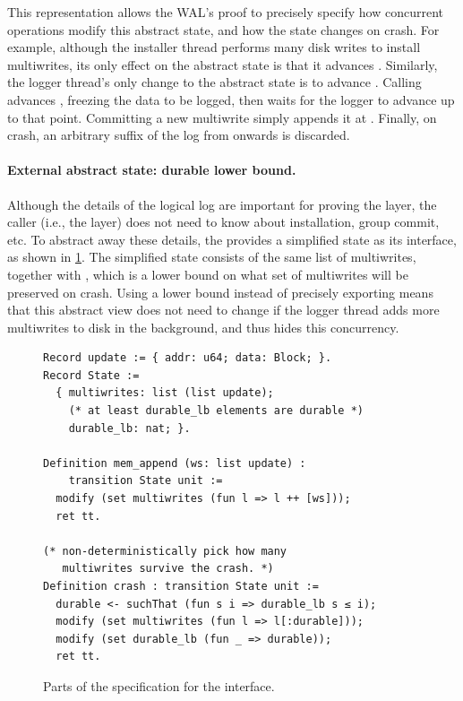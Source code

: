 This representation allows the WAL's proof to precisely specify how concurrent
operations modify this abstract state, and how the state changes on crash.
For example, although the installer thread performs many disk writes to
install multiwrites, its only effect on the abstract state is that it
advances .  Similarly, the logger thread's only change to
the abstract state is to advance .  Calling 
advances , freezing the data to be logged, then waits
for the logger to advance  up to that point.  Committing a
new multiwrite simply appends it at .  Finally, on crash,
an arbitrary suffix of the log from  onwards is discarded.


\paragraph{External abstract state: durable lower bound.}
Although the details of the logical log are important for proving the
 layer, the caller (i.e., the  layer) does not need
to know about installation, group commit, etc. To abstract away these
details, the  provides a simplified state as its interface,
as shown in \cref{fig:wal-spec}.  The simplified state consists of
the same list of multiwrites, together with , which is
a lower bound on what set of multiwrites will be preserved on crash.
Using a lower bound instead of precisely exporting  means
that this abstract view does not need to change if the logger thread
adds more multiwrites to disk in the background, and thus hides
this concurrency.

\begin{figure}[ht]
  \begin{verbatim}
Record update := { addr: u64; data: Block; }.
Record State :=
  { multiwrites: list (list update);
    (* at least durable_lb elements are durable *)
    durable_lb: nat; }.

Definition mem_append (ws: list update) :
    transition State unit :=
  modify (set multiwrites (fun l => l ++ [ws]));
  ret tt.

(* non-deterministically pick how many
   multiwrites survive the crash. *)
Definition crash : transition State unit :=
  durable <- suchThat (fun s i => durable_lb s ≤ i);
  modify (set multiwrites (fun l => l[:durable]));
  modify (set durable_lb (fun _ => durable));
  ret tt.
  \end{verbatim}
\caption{Parts of the specification for the  interface.}
\label{fig:wal-spec}
\end{figure}


